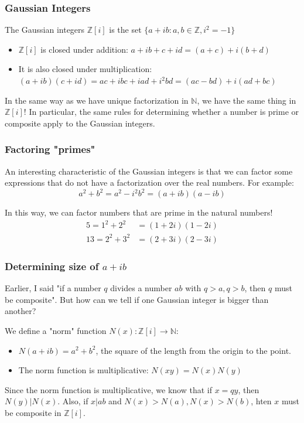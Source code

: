 \documentclass{beamer}
\begin{document}
\begin{frame}
	\frametitle{Gaussian Integers}
	The Gaussian integers $\mathbb{Z}[i]$ is the set 
	$\{a+ib:a, b \in \mathbb{Z}, i^2 = -1 \}$

	\begin{itemize}
		\item $\mathbb{Z}[i]$ is closed under addition: $a+ib + c+id = (a+c) + i(b+d)$
		\item It is also closed under multiplication:
			$(a+ib)(c+id) = ac + ibc + iad + i^2bd = (ac-bd) + i(ad+bc)$
	\end{itemize}

	In the same way as we have unique factorization in $\mathbb{N}$, we have the same thing in
	$\mathbb{Z}[i]$! In particular, the same rules for determining whether a number is prime or
	composite apply to the Gaussian integers.
\end{frame}

\begin{frame}
	\frametitle{Factoring "primes"}

	An interesting characteristic of the Gaussian integers is that we can factor some
	expressions that do not have a factorization over the real numbers. For example:
	\[a^2 + b^2 = a^2 - i^2b^2 = (a+ib)(a-ib) \]

	In this way, we can factor numbers that are prime in the natural numbers!
	\begin{align*}
		5 = 1^2 + 2^2 &= (1+2i)(1-2i) \\
		13 = 2^2 + 3^2 &= (2+3i)(2-3i)
	\end{align*}
\end{frame}

\begin{frame}
	\frametitle{Determining size of $a+ib$}

	Earlier, I said "if a number $q$ divides a number $ab$ with $q>a, q>b$, then $q$ must be composite".
	But how can we tell if one Gaussian integer is bigger than another?

	We define a "norm" function $N(x):\mathbb{Z}[i]\rightarrow\mathbb{N}$:
	\begin{itemize}
		\item $N(a+ib) = a^2 + b^2$, the square of the length from the origin to the point.
		\item The norm function is multiplicative: $N(xy) = N(x)N(y)$
	\end{itemize}

	Since the norm function is multiplicative, we know that if $x = qy$, then $N(y)|N(x)$.
	Also, if $x | ab$ and $N(x) > N(a), N(x) > N(b)$, hten $x$ must be composite in $\mathbb{Z}[i]$.
\end{frame}
\end{document}
